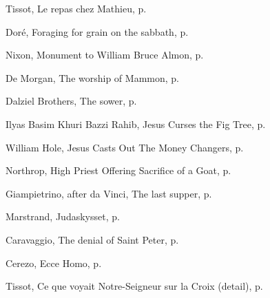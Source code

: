 \documentclass[10pt,twoside]{article} %
\newcommand{\artcredit}[3]{#2, #3, p.~\pageref{fig:#1}}
\begin{document}
\artcredit{meal-in-house-of-matthew}{Tissot}{Le repas chez Mathieu}

\artcredit{plucking-corn-on-the-sabbath}{Doré}{Foraging for grain on the sabbath}

\artcredit{good-samaritan}{Nixon}{Monument to William Bruce Almon}

\artcredit{mammon}{De Morgan}{The worship of Mammon}

\artcredit{sower}{Dalziel Brothers}{The sower}

\artcredit{cursing-fig-tree}{Ilyas Basim Khuri Bazzi Rahib}{Jesus Curses the Fig Tree}

\artcredit{money-changers-william-hole}{William Hole}{Jesus Casts Out The Money Changers}

\artcredit{altar}{Northrop}{High Priest Offering Sacrifice of a Goat}

\artcredit{last-supper}{Giampietrino, after da Vinci}{The last supper}

\artcredit{judas-kiss}{Marstrand}{Judaskysset}

\artcredit{denial-of-saint-peter}{Caravaggio}{The denial of Saint Peter}

\artcredit{ecce-homo}{Cerezo}{Ecce Homo}

\artcredit{what-our-lord-saw-from-the-cross-detail}{Tissot}{Ce que voyait Notre-Seigneur sur la Croix (detail)}
\end{document}
